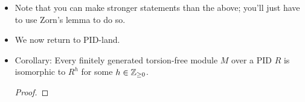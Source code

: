 \documentclass[../notes.tex]{subfiles}
\begin{document}
\begin{itemize}
\begin{enumerate}[label={(\roman*)}]
\begin{proof}
            \begin{equation*}
                M' = \sum_{i=1}^hRu_i
                \cong R^h
            \end{equation*}
            where the latter isomorphism follows from Proposition \ref{prp:10.5}.
        \end{proof}
        \item There exists a nonzero $a\in R$ such that $aM\subset M'$ (equivalently, $a(M/M')=0$).
        \begin{proof}
            Pick $w\in S$ such that $w\notin T$. Then since we picked $T$ to be a \emph{maximal} linear independence set, $T\cup\{w\}$ is linearly \emph{dependent}. It follows that there exists a nonzero $(a_1,\dots,a_{h+1})\in R^{h+1}$ such that
            \begin{equation*}
                a_1u_1+\cdots+a_hu_h+a_{h+1}w = 0
            \end{equation*}
            If $a_{h+1}=0$, then $(a_1,\dots,a_h)\neq 0$ makes $a_1u_1+\cdots+a_hu_h=0$, contradicting the assumed linear independence of $T$. Thus, $a_{h+1}\neq 0$. It follows that
            \begin{equation*}
                a_{h+1}w = -\sum_{i=1}^ha_iu_i \in M'
            \end{equation*}
            We may repeat this process for any $w\in S-T$ to obtain a nonzero $a_w$ such that $a_ww\in M'$. Additionally, if $w\in T$, take $a_w=1$. Now define
            \begin{equation*}
                a = \prod_{w\in S}a_w
            \end{equation*}
            Since $R$ is an integral domain by hypothesis and each $a_w$ in the above product is nonzero, $a$ is nonzero. Moreover, by its construction, $aw\in M'$ for all $w\in S$. Therefore,
            \begin{equation*}
                aM = a\left( \sum_{s\in S}As \right)
                \subset M'
            \end{equation*}
            as desired.
        \end{proof}
    \end{enumerate}
    \item Note that you can make stronger statements than the above; you'll just have to use Zorn's lemma to do so.
    \item We now return to PID-land.
    \item Corollary: Every finitely generated torsion-free module $M$ over a PID $R$ is isomorphic to $R^h$ for some $h\in{\mathbb{Z}_{\geq 0}}$.
    \begin{proof}


\end{proof}
\end{itemize}
\end{document}
